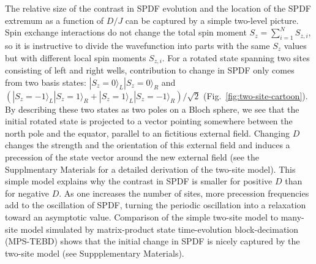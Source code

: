 \documentclass[aps,prl,twocolumn,superscriptaddress]{revtex4-1}
\begin{document}
The relative size of the contrast in SPDF evolution and the location of the SPDF extremum as a function of $D/J$ can be captured by a simple two-level picture. Spin exchange interactions do not change the total spin moment $S_z = \sum_{i=1}^{N} S_{z,i}$, so it is instructive to divide the wavefunction into parts with the same $S_z$ values but with different local spin moments $S_{z,i}$. For a rotated state spanning two sites consisting of left and right wells, contribution to change in SPDF only comes from two basis states: $|S_z=0\rangle_L |S_z=0\rangle_R$ and $(|S_z = -1\rangle_L |S_z=1\rangle_R +|S_z = 1\rangle_L |S_z=-1\rangle_R)/\sqrt{2}$ (Fig.~\ref{fig:two-site-cartoon}). By describing these two states as two poles on a Bloch sphere, we see that the initial rotated state is projected to a vector pointing somewhere between the north pole and the equator, parallel to an fictitious external field. Changing $D$ changes the strength and the orientation of this external field and induces a precession of the state vector around the new external field (see the Supplmentary Materials for a detailed derivation of the two-site model). This simple model explains why the contrast in SPDF is smaller for positive $D$ than for negative $D$. As one increases the number of sites, more precession frequencies add to the oscillation of SPDF, turning the periodic oscillation into a relaxation toward an asymptotic value. Comparison of the simple two-site model to many-site model simulated by matrix-product state time-evolution block-decimation (MPS-TEBD) shows that the initial change in SPDF is nicely captured by the two-site model (see Suppplementary Materials). 
\end{document}

